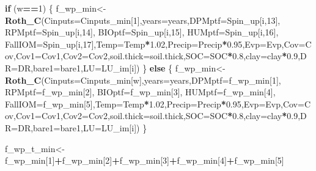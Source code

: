 \documentclass[
  10pt,
  b5paper,
]{book}
\newenvironment{Shaded}{\begin{snugshade}}{\end{snugshade}}
\newcommand{\ControlFlowTok}[1]{\textcolor[rgb]{0.13,0.29,0.53}{\textbf{#1}}}
\newcommand{\DataTypeTok}[1]{\textcolor[rgb]{0.13,0.29,0.53}{#1}}
\newcommand{\DecValTok}[1]{\textcolor[rgb]{0.00,0.00,0.81}{#1}}
\newcommand{\FloatTok}[1]{\textcolor[rgb]{0.00,0.00,0.81}{#1}}
\newcommand{\KeywordTok}[1]{\textcolor[rgb]{0.13,0.29,0.53}{\textbf{#1}}}
\newcommand{\NormalTok}[1]{#1}
\newcommand{\OperatorTok}[1]{\textcolor[rgb]{0.81,0.36,0.00}{\textbf{#1}}}
\begin{document}
\begin{Shaded}
\begin{Highlighting}[]
{\ControlFlowTok{if}\NormalTok{ (w}\OperatorTok{==}\DecValTok{1}\NormalTok{) \{}
\NormalTok{f_wp_min<-}\KeywordTok{Roth_C}\NormalTok{(}\DataTypeTok{Cinputs=}\NormalTok{Cinputs_min[}\DecValTok{1}\NormalTok{],}\DataTypeTok{years=}\NormalTok{years,}\DataTypeTok{DPMptf=}\NormalTok{Spin_up[i,}\DecValTok{13}\NormalTok{], }\DataTypeTok{RPMptf=}\NormalTok{Spin_up[i,}\DecValTok{14}\NormalTok{], }\DataTypeTok{BIOptf=}\NormalTok{Spin_up[i,}\DecValTok{15}\NormalTok{], }\DataTypeTok{HUMptf=}\NormalTok{Spin_up[i,}\DecValTok{16}\NormalTok{], }\DataTypeTok{FallIOM=}\NormalTok{Spin_up[i,}\DecValTok{17}\NormalTok{],}\DataTypeTok{Temp=}\NormalTok{Temp}\OperatorTok{*}\FloatTok{1.02}\NormalTok{,}\DataTypeTok{Precip=}\NormalTok{Precip}\OperatorTok{*}\FloatTok{0.95}\NormalTok{,}\DataTypeTok{Evp=}\NormalTok{Evp,}\DataTypeTok{Cov=}\NormalTok{Cov,}\DataTypeTok{Cov1=}\NormalTok{Cov1,}\DataTypeTok{Cov2=}\NormalTok{Cov2,}\DataTypeTok{soil.thick=}\NormalTok{soil.thick,}\DataTypeTok{SOC=}\NormalTok{SOC}\OperatorTok{*}\FloatTok{0.8}\NormalTok{,}\DataTypeTok{clay=}\NormalTok{clay}\OperatorTok{*}\FloatTok{0.9}\NormalTok{,}\DataTypeTok{DR=}\NormalTok{DR,}\DataTypeTok{bare1=}\NormalTok{bare1,}\DataTypeTok{LU=}\NormalTok{LU_im[i])}
\NormalTok{\} }\ControlFlowTok{else}\NormalTok{ \{}
\NormalTok{f_wp_min<-}\KeywordTok{Roth_C}\NormalTok{(}\DataTypeTok{Cinputs=}\NormalTok{Cinputs_min[w],}\DataTypeTok{years=}\NormalTok{years,}\DataTypeTok{DPMptf=}\NormalTok{f_wp_min[}\DecValTok{1}\NormalTok{], }\DataTypeTok{RPMptf=}\NormalTok{f_wp_min[}\DecValTok{2}\NormalTok{], }\DataTypeTok{BIOptf=}\NormalTok{f_wp_min[}\DecValTok{3}\NormalTok{], }\DataTypeTok{HUMptf=}\NormalTok{f_wp_min[}\DecValTok{4}\NormalTok{], }\DataTypeTok{FallIOM=}\NormalTok{f_wp_min[}\DecValTok{5}\NormalTok{],}\DataTypeTok{Temp=}\NormalTok{Temp}\OperatorTok{*}\FloatTok{1.02}\NormalTok{,}\DataTypeTok{Precip=}\NormalTok{Precip}\OperatorTok{*}\FloatTok{0.95}\NormalTok{,}\DataTypeTok{Evp=}\NormalTok{Evp,}\DataTypeTok{Cov=}\NormalTok{Cov,}\DataTypeTok{Cov1=}\NormalTok{Cov1,}\DataTypeTok{Cov2=}\NormalTok{Cov2,}\DataTypeTok{soil.thick=}\NormalTok{soil.thick,}\DataTypeTok{SOC=}\NormalTok{SOC}\OperatorTok{*}\FloatTok{0.8}\NormalTok{,}\DataTypeTok{clay=}\NormalTok{clay}\OperatorTok{*}\FloatTok{0.9}\NormalTok{,}\DataTypeTok{DR=}\NormalTok{DR,}\DataTypeTok{bare1=}\NormalTok{bare1,}\DataTypeTok{LU=}\NormalTok{LU_im[i])}
\NormalTok{\}}

\NormalTok{f_wp_t_min<-f_wp_min[}\DecValTok{1}\NormalTok{]}\OperatorTok{+}\NormalTok{f_wp_min[}\DecValTok{2}\NormalTok{]}\OperatorTok{+}\NormalTok{f_wp_min[}\DecValTok{3}\NormalTok{]}\OperatorTok{+}\NormalTok{f_wp_min[}\DecValTok{4}\NormalTok{]}\OperatorTok{+}\NormalTok{f_wp_min[}\DecValTok{5}\NormalTok{]}

}
\end{Highlighting}
\end{Shaded}
\end{document}
